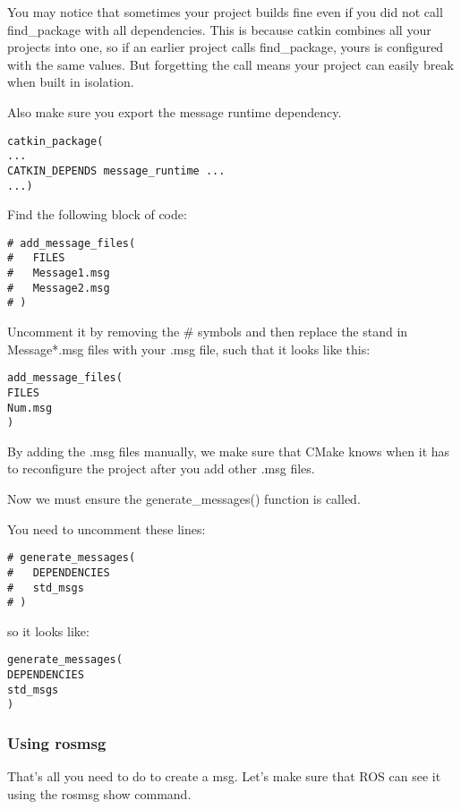 You may notice that sometimes your project builds fine even if you did not call find\_package with all dependencies. This is because catkin combines all your projects into one, so if an earlier project calls find\_package, yours is configured with the same values. But forgetting the call means your project can easily break when built in isolation.

Also make sure you export the message runtime dependency.

\begin{lstlisting}[breaklines=true languages=bash]
catkin_package(
...
CATKIN_DEPENDS message_runtime ...
...)
\end{lstlisting}

Find the following block of code:

\begin{lstlisting}[breaklines=true languages=bash]
# add_message_files(
#   FILES
#   Message1.msg
#   Message2.msg
# )
\end{lstlisting}

Uncomment it by removing the \# symbols and then replace the stand in Message*.msg files with your .msg file, such that it looks like this:

\begin{lstlisting}[breaklines=true languages=bash]
add_message_files(
FILES
Num.msg
)
\end{lstlisting}

By adding the .msg files manually, we make sure that CMake knows when it has to reconfigure the project after you add other .msg files.

Now we must ensure the generate\_messages() function is called.

You need to uncomment these lines:

\begin{lstlisting}[breaklines=true languages=bash]
# generate_messages(
#   DEPENDENCIES
#   std_msgs
# )
\end{lstlisting}

so it looks like:

\begin{lstlisting}[breaklines=true languages=bash]
generate_messages(
DEPENDENCIES
std_msgs
)
\end{lstlisting}

\subsubsection{Using rosmsg}
That's all you need to do to create a msg. Let's make sure that ROS can see it using the rosmsg show command.

